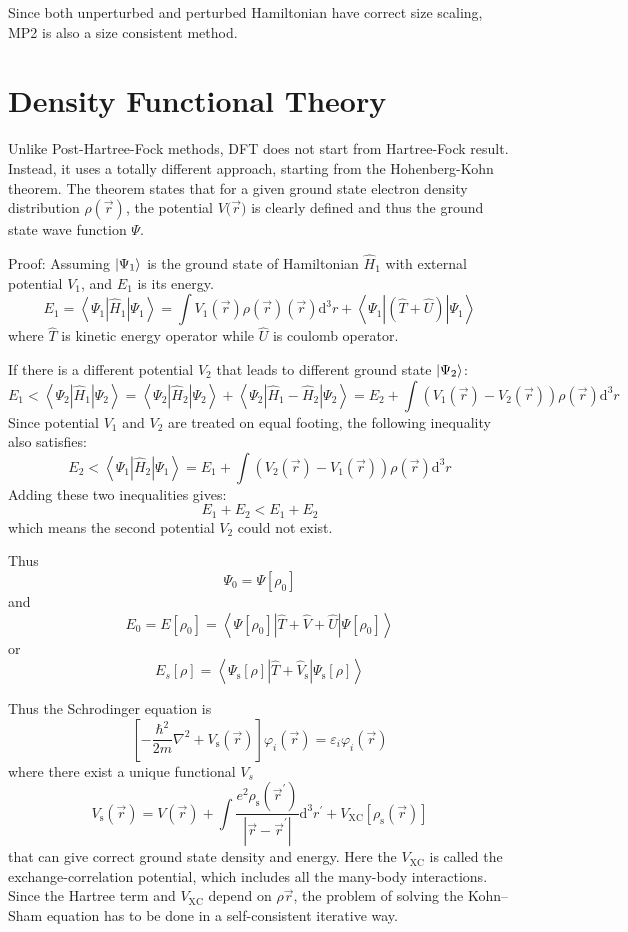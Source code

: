 Since both unperturbed and perturbed Hamiltonian have correct size scaling, MP2 is also a size consistent method.

\section{Density Functional Theory}

Unlike Post-Hartree-Fock methods, DFT does not start from Hartree-Fock result.
Instead, it uses a totally different approach, starting from the Hohenberg-Kohn theorem. \cite{hktheorem}
The theorem states that for a given ground state electron density distribution $\rho ({\vec{r}})$, the potential $V ({\vec{r})}$ is clearly defined and thus the ground state wave function $\Psi$.

Proof:
Assuming $\ket{\Psi_1}$ is the ground state of Hamiltonian $\hat{H}_1$ with external potential $V_1$, and $E_1$ is its energy.
$$
E_{1}=\left\langle\Psi_{1}\left|\hat{H}_{1}\right| \Psi_{1}\right\rangle=\int V_{1}(\vec{r}) \rho(\vec{r})(\vec{r}) \mathrm{d}^{3} r+\left\langle\Psi_{1}|(\hat{T}+\hat{U})| \Psi_{1}\right\rangle
$$
where $\hat{T}$ is kinetic energy operator while $\hat{U}$ is coulomb operator.

If there is a different potential $V_2$ that leads to different ground state $\ket{\Psi_2}$:
$$
E_{1}<\left\langle\Psi_{2}\left|\hat{H}_{1}\right| \Psi_{2}\right\rangle=\left\langle\Psi_{2}\left|\hat{H}_{2}\right| \Psi_{2}\right\rangle+\left\langle\Psi_{2}\left|\hat{H}_{1}-\hat{H}_{2}\right| \Psi_{2}\right\rangle= E_{2}+\int\left(V_{1}(\vec{r})-V_{2}(\vec{r})\right) \rho(\vec{r}) \mathrm{d}^{3} r
$$
Since potential $V_1$ and $V_2$ are treated on equal footing, the following inequality also satisfies:
$$
E_{2}<\left\langle\Psi_{1}\left|\hat{H}_{2}\right| \Psi_{1}\right\rangle= E_{1}+\int\left(V_{2}(\vec{r})-V_{1}(\vec{r})\right) \rho(\vec{r}) \mathrm{d}^{3} r
$$
Adding these two inequalities gives:
$$
E_{1}+E_{2}<E_{1}+E_{2}
$$
which means the second potential $V_2$ could not exist.

Thus
$$
\Psi_{0}=\Psi[\rho_{0}]
$$
and
$$
E_{0}=E[\rho_{0}]=\left\langle\Psi[\rho_{0}]|\hat{T}+\hat{V}+\hat{U}| \Psi[\rho_{0}]\right\rangle
$$
or
$$
E_{s}[\rho]=\left\langle\Psi_{\mathrm{s}}[\rho]\left|\hat{T}+\hat{V}_{\mathrm{s}}\right| \Psi_{\mathrm{s}}[\rho]\right\rangle
$$

Thus the Schrodinger equation is 
$$
\left[-\frac{\hbar^{2}}{2 m} \nabla^{2}+V_{\mathrm{s}}(\vec{r})\right] \varphi_{i}(\vec{r})=\varepsilon_{i} \varphi_{i}(\vec{r})
$$
where there exist a unique functional $V_s$
$$
V_{\mathrm{s}}(\vec{r})=V(\vec{r})+\int \frac{e^{2} \rho_{\mathrm{s}}\left(\vec{r}^{\prime}\right)}{\left|\vec{r}-\vec{r}^{\prime}\right|} \mathrm{d}^{3} r^{\prime}+V_{\mathrm{XC}}\left[\rho_{\mathrm{s}}(\vec{r})\right]
$$
that can give correct ground state density and energy.
Here the $V_{\mathrm{XC}}$ is called the exchange-correlation potential, which includes all the many-body interactions.
Since the Hartree term and $V_{\mathrm{XC}}$ depend on $\rho{\vec{r}}$, the problem of solving the Kohn–Sham equation has to be done in a self-consistent iterative way.

